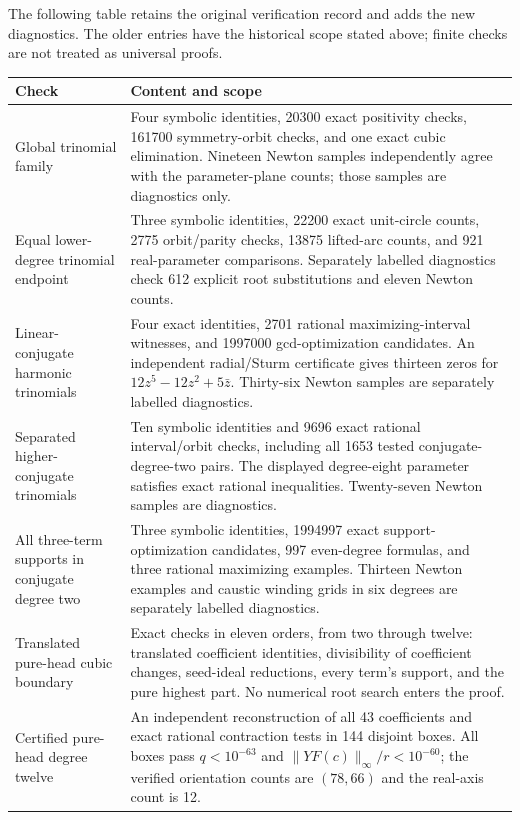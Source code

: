 \documentclass[UTF8,11pt]{ctexart}
\theoremstyle{definition}
\numberwithin{equation}{section}
\begin{document}
The following table retains the original verification record and adds
the new diagnostics. The older entries have the historical scope stated
above; finite checks are not treated as universal proofs.
\begin{longtable}{@{}>{\raggedright\arraybackslash}p{}>{\raggedright\arraybackslash}p{}@{}}
\toprule
Check & Content and scope \\
\midrule
\endhead
Global trinomial family & Four symbolic identities, 20300 exact positivity checks, 161700 symmetry-orbit checks, and one exact cubic elimination. Nineteen Newton samples independently agree with the parameter-plane counts; those samples are diagnostics only. \\
Equal lower-degree trinomial endpoint & Three symbolic identities, 22200 exact unit-circle counts, 2775 orbit/parity checks, 13875 lifted-arc counts, and 921 real-parameter comparisons. Separately labelled diagnostics check 612 explicit root substitutions and eleven Newton counts. \\
Linear-conjugate harmonic trinomials & Four exact identities, 2701 rational maximizing-interval witnesses, and 1997000 gcd-optimization candidates. An independent radial/Sturm certificate gives thirteen zeros for $12z^5-12z^2+5\bar z$. Thirty-six Newton samples are separately labelled diagnostics. \\
Separated higher-conjugate trinomials & Ten symbolic identities and 9696 exact rational interval/orbit checks, including all 1653 tested conjugate-degree-two pairs. The displayed degree-eight parameter satisfies exact rational inequalities. Twenty-seven Newton samples are diagnostics. \\
All three-term supports in conjugate degree two & Three symbolic identities, 1994997 exact support-optimization candidates, 997 even-degree formulas, and three rational maximizing examples. Thirteen Newton examples and caustic winding grids in six degrees are separately labelled diagnostics. \\
Translated pure-head cubic boundary & Exact checks in eleven orders, from two through twelve: translated coefficient identities, divisibility of coefficient changes, seed-ideal reductions, every term's support, and the pure highest part. No numerical root search enters the proof. \\
Certified pure-head degree twelve & An independent reconstruction of all 43 coefficients and exact rational contraction tests in 144 disjoint boxes. All boxes pass $q<10^{-63}$ and $\|YF(c)\|_\infty/r<10^{-60}$; the verified orientation counts are $(78,66)$ and the real-axis count is 12. \\

\end{longtable}
\end{document}
